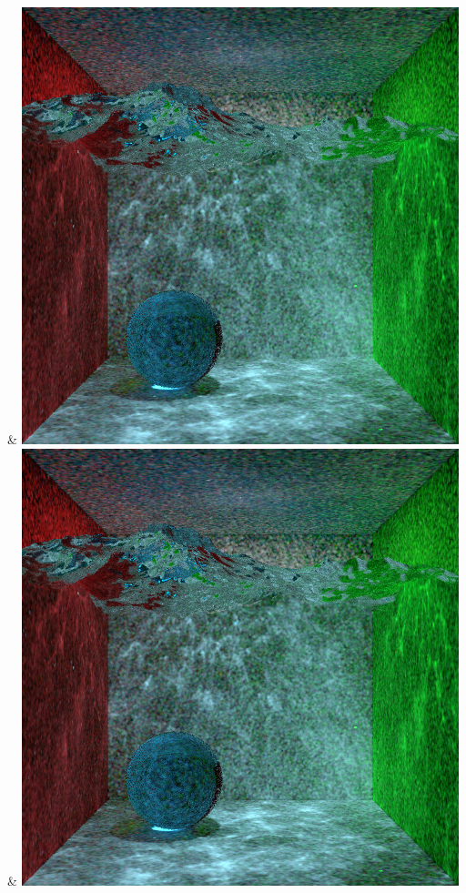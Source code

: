 & \includegraphics[width=\linewidth]{figures/py/tests/photon_optimization/SER+Reject70_1spp.png}
& \includegraphics[width=\linewidth]{figures/py/tests/photon_optimization/SER+Reject70+RejectN_1spp.png}
